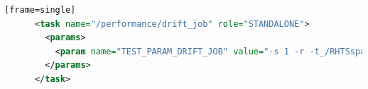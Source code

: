 \documentclass[
  color, %
  table, %
  lof,   %
  lot,   %
]{fithesis3}
\begin{document}
\begin{lstlisting}[language=xml, caption={Scheduling file system aging task in Beaker environment},label={ex:aging}][frame=single]
      <task name="/performance/drift_job" role="STANDALONE">
        <params>
          <param name="TEST_PARAM_DRIFT_JOB" value="-s 1 -r -t_/RHTSspareLUN1-o_12000000-f_4000000-+v_10000-w_wtable4.csv-i_300-+D_gaussian-T_on-Y_50-N_on -d /dev/sdb1 -M /RHTSspareLUN1 -t 1SASHDD -q W4595 -m 5_99 -f 0"/>
        </params>
      </task>
\end{lstlisting}


\printbibliography[heading=bibintoc]
\end{document}

